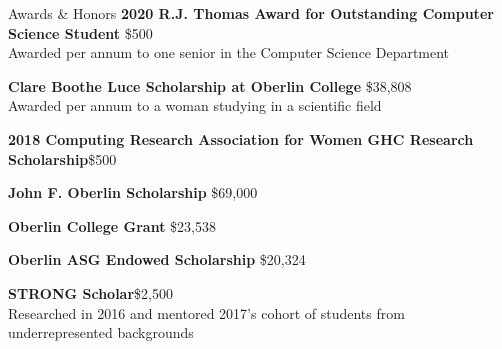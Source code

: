 \documentclass{resume}
\begin{document}
\begin{rSection}{Awards \& Honors} 
{\bf 2020 R.J. Thomas Award for Outstanding Computer Science Student} \hfill{\$500} \\
Awarded per annum to one senior in the Computer Science Department

{\bf Clare Boothe Luce Scholarship at Oberlin College} \hfill{\$38,808} \\
Awarded per annum to a woman studying in a scientific field

{\bf 2018 Computing Research Association for Women GHC Research Scholarship}\hfill{\$500} 

{\bf John F. Oberlin Scholarship } \hfill{\$69,000}

{\bf Oberlin College Grant } \hfill {\$23,538}

{\bf Oberlin ASG Endowed Scholarship} \hfill {\$20,324}

{\bf STRONG Scholar}\hfill{\$2,500} \\
 Researched in 2016 and mentored 2017's cohort of students from underrepresented backgrounds
\end{rSection}
\end{document}
